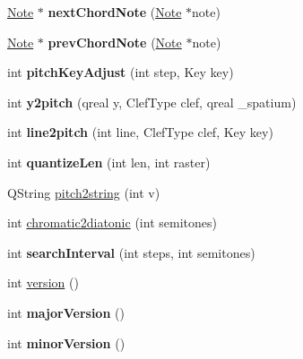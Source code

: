 \begin{DoxyCompactItemize}
\item 
\mbox{\label{namespace_ms_a3a16ba4da464f3d39a552a7580f771e4}} 
\hyperlink{class_ms_1_1_note}{Note} $\ast$ {\bfseries next\+Chord\+Note} (\hyperlink{class_ms_1_1_note}{Note} $\ast$note)
\item 
\mbox{\label{namespace_ms_a6940d0926de3309b1dcdd9ed64f69394}} 
\hyperlink{class_ms_1_1_note}{Note} $\ast$ {\bfseries prev\+Chord\+Note} (\hyperlink{class_ms_1_1_note}{Note} $\ast$note)
\item 
\mbox{\label{namespace_ms_a2379b60623ceebb65754731d411d7dce}} 
int {\bfseries pitch\+Key\+Adjust} (int step, Key key)
\item 
\mbox{\label{namespace_ms_a4895000b64e9b58d96e00cdec5eb1149}} 
int {\bfseries y2pitch} (qreal y, Clef\+Type clef, qreal \+\_\+spatium)
\item 
\mbox{\label{namespace_ms_a64085086afbf8dd98d77e7331518a926}} 
int {\bfseries line2pitch} (int line, Clef\+Type clef, Key key)
\item 
\mbox{\label{namespace_ms_a58e7e69cf768f65a0aee4243553fd06c}} 
int {\bfseries quantize\+Len} (int len, int raster)
\item 
Q\+String \hyperlink{namespace_ms_ac693877b9b12787ad106a3f11c045cf8}{pitch2string} (int v)
\item 
int \hyperlink{namespace_ms_a6cdf049ca0474b5b8d301da33d6873dd}{chromatic2diatonic} (int semitones)
\item 
\mbox{\label{namespace_ms_aa776f7a2c8da6a16a5e1a09748d315f1}} 
int {\bfseries search\+Interval} (int steps, int semitones)
\item 
int \hyperlink{namespace_ms_a9c672c5c75133bc06bb59bef7bed8b03}{version} ()
\item 
\mbox{\label{namespace_ms_a6099b74058ae817d1c59739b07cdc235}} 
int {\bfseries major\+Version} ()
\item 
\mbox{\label{namespace_ms_a48eed4b3b9617396909b11878d487e88}} 
int {\bfseries minor\+Version} ()
\item 
\mbox{\label{namespace_ms_a4536f5360c7999a8e710f3af9456e30d}} 

\end{DoxyCompactItemize}
